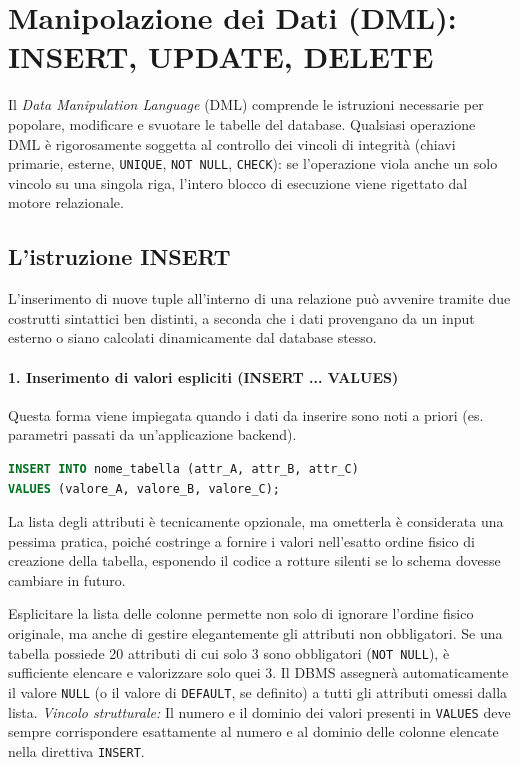 \section{Manipolazione dei Dati (DML): INSERT, UPDATE, DELETE}

Il \textit{Data Manipulation Language} (DML) comprende le istruzioni necessarie per popolare, modificare e svuotare le tabelle del database. Qualsiasi operazione DML è rigorosamente soggetta al controllo dei vincoli di integrità (chiavi primarie, esterne, \texttt{UNIQUE}, \texttt{NOT NULL}, \texttt{CHECK}): se l'operazione viola anche un solo vincolo su una singola riga, l'intero blocco di esecuzione viene rigettato dal motore relazionale.

\subsection{L'istruzione INSERT}

L'inserimento di nuove tuple all'interno di una relazione può avvenire tramite due costrutti sintattici ben distinti, a seconda che i dati provengano da un input esterno o siano calcolati dinamicamente dal database stesso.

\paragraph{1. Inserimento di valori espliciti (INSERT ... VALUES)}
Questa forma viene impiegata quando i dati da inserire sono noti a priori (es. parametri passati da un'applicazione backend).

\begin{lstlisting}[language=SQL, basicstyle=\ttfamily\small, keywordstyle=\color{blue}\bfseries]
INSERT INTO nome_tabella (attr_A, attr_B, attr_C)
VALUES (valore_A, valore_B, valore_C);
\end{lstlisting}

La lista degli attributi è tecnicamente opzionale, ma ometterla è considerata una pessima pratica, poiché costringe a fornire i valori nell'esatto ordine fisico di creazione della tabella, esponendo il codice a rotture silenti se lo schema dovesse cambiare in futuro.

\begin{observation}
Esplicitare la lista delle colonne permette non solo di ignorare l'ordine fisico originale, ma anche di gestire elegantemente gli attributi non obbligatori. Se una tabella possiede 20 attributi di cui solo 3 sono obbligatori (\texttt{NOT NULL}), è sufficiente elencare e valorizzare solo quei 3. Il DBMS assegnerà automaticamente il valore \texttt{NULL} (o il valore di \texttt{DEFAULT}, se definito) a tutti gli attributi omessi dalla lista.
\textit{Vincolo strutturale:} Il numero e il dominio dei valori presenti in \texttt{VALUES} deve sempre corrispondere esattamente al numero e al dominio delle colonne elencate nella direttiva \texttt{INSERT}.
\end{observation}

